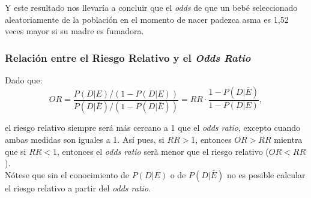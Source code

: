 Y este resultado nos llevaría a concluir que el \textit{odds} de que un bebé seleccionado aleatoriamente de la población en el momento de nacer padezca asma es 1,52 veces mayor si su madre es fumadora.\\

\subsubsection{Relación entre el Riesgo Relativo y el \textit{Odds Ratio}}
Dado que:
\begin{equation*}
OR=\frac{P(D|E)/(1-P(D|E))}{P(D|\bar{E})/(1-P(D|\bar{E}))}=RR \cdot \frac{1-P(D|\bar{E})}{1-P(D|E)},
\end{equation*}

el riesgo relativo siempre será más cercano a 1 que el \textit{odds ratio}, excepto cuando ambas medidas son iguales a 1. Así pues, si $RR>1$, entonces $OR > RR$ mientra que si $RR<1$, entonces el  \textit{odds ratio} serà menor que el riesgo relativo ($OR < RR$).\\

Nótese que sin el conocimiento de $P(D|E)$ o de $P(D|\bar{E})$ no es posible calcular el riesgo relativo a partir del \textit{odds ratio}.


